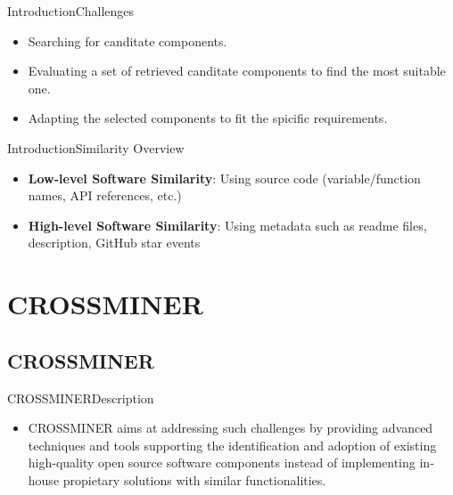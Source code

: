 \documentclass{beamer}
\begin{document}
\begin{frame}{Introduction}{Challenges}

\begin{itemize}
	\item Searching for canditate components.
	\item Evaluating a set of retrieved canditate components to find the most suitable one.
	\item Adapting the selected components to fit the spicific requirements.
\end{itemize}

\end{frame}

\begin{frame}{Introduction}{Similarity Overview}
	\begin{itemize}
		\item \textbf{Low-level Software Similarity}: Using source code
				(variable/function names, API references, etc.)
		\item \textbf{High-level Software Similarity}: Using metadata
				such as readme files, description, GitHub star events
	\end{itemize}
\end{frame}

\section{CROSSMINER}
\subsection{CROSSMINER}

\begin{frame}{CROSSMINER}{Description}
\begin{itemize}
	\item CROSSMINER aims at addressing such challenges by providing
	advanced techniques and tools supporting the identification
	and adoption of existing high-quality open source software 
	components instead of implementing in-house propietary solutions
	with similar functionalities.
\end{itemize}

\end{frame}
\end{document}
